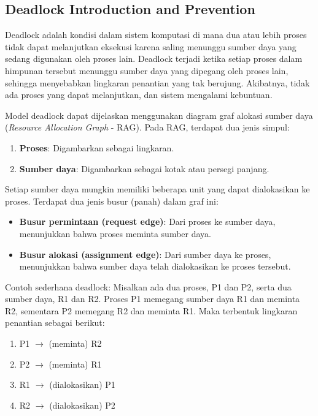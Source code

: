 \documentclass[12pt]{article}
\begin{document}
\subsection{Deadlock Introduction and Prevention}
Deadlock adalah kondisi dalam sistem komputasi di mana dua atau lebih proses tidak dapat melanjutkan eksekusi karena saling menunggu sumber daya yang sedang digunakan oleh proses lain. Deadlock terjadi ketika setiap proses dalam himpunan tersebut menunggu sumber daya yang dipegang oleh proses lain, sehingga menyebabkan lingkaran penantian yang tak berujung. Akibatnya, tidak ada proses yang dapat melanjutkan, dan sistem mengalami kebuntuan.

Model deadlock dapat dijelaskan menggunakan diagram graf alokasi sumber daya (\textit{Resource Allocation Graph} - RAG). Pada RAG, terdapat dua jenis simpul:

\begin{enumerate}
    \item \textbf{Proses}: Digambarkan sebagai lingkaran.
    \item \textbf{Sumber daya}: Digambarkan sebagai kotak atau persegi panjang.
\end{enumerate}

Setiap sumber daya mungkin memiliki beberapa unit yang dapat dialokasikan ke proses. Terdapat dua jenis busur (panah) dalam graf ini:

\begin{itemize}
    \item \textbf{Busur permintaan (request edge)}: Dari proses ke sumber daya, menunjukkan bahwa proses meminta sumber daya.
    \item \textbf{Busur alokasi (assignment edge)}: Dari sumber daya ke proses, menunjukkan bahwa sumber daya telah dialokasikan ke proses tersebut.
\end{itemize}

Contoh sederhana deadlock: Misalkan ada dua proses, P1 dan P2, serta dua sumber daya, R1 dan R2. Proses P1 memegang sumber daya R1 dan meminta R2, sementara P2 memegang R2 dan meminta R1. Maka terbentuk lingkaran penantian sebagai berikut:

\begin{enumerate}
    \item P1 $\rightarrow$ (meminta) R2
    \item P2 $\rightarrow$ (meminta) R1
    \item R1 $\rightarrow$ (dialokasikan) P1
    \item R2 $\rightarrow$ (dialokasikan) P2
\end{enumerate}
\end{document}
